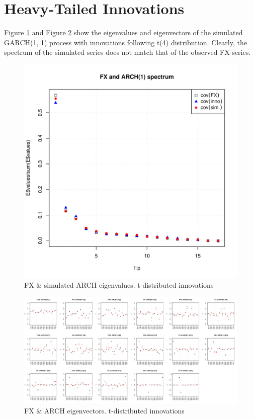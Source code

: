 \documentclass{article}
\begin{document}
\section{Heavy-Tailed Innovations}
Figure \ref{fig:ARCH_t_FX_eigenvalues} and Figure
\ref{fig:ARCH_t_FX_eigenvectors} show the eigenvalues and
eigenvectors of the simulated GARCH(1, 1) process with innovations
following t(4) distribution. Clearly, the spectrum of the simulated
series does not match that of the observed FX series.
\begin{figure}[htb!]
  \centering
  \includegraphics[scale=0.4]{FX_eigenvalues_ARCH_t_inno.pdf}  
  \caption{FX \& simulated ARCH eigenvalues. t-distributed innovations}
  \label{fig:ARCH_t_FX_eigenvalues}
\end{figure}

\begin{figure}[htb!]
  \centering
  \includegraphics[scale=0.3]{FX_eigenvectors_ARCH_t_inno.pdf}  
  \caption{FX \& ARCH eigenvectors. t-distributed innovations}
  \label{fig:ARCH_t_FX_eigenvectors}
\end{figure}
\end{document}
